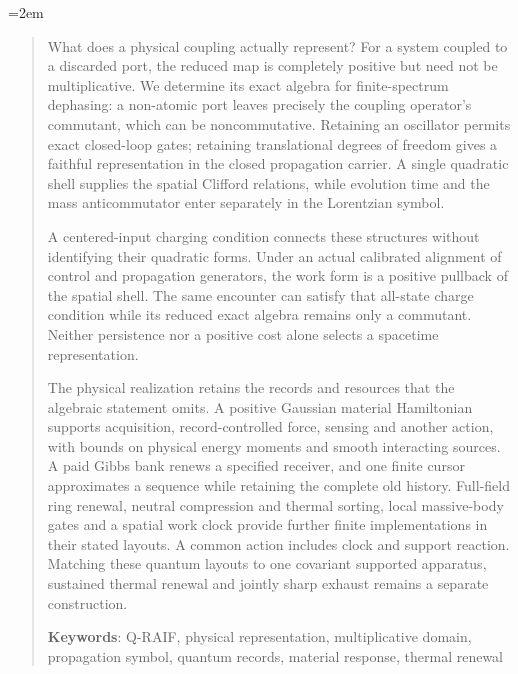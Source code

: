 
\emergencystretch=2em
\raggedbottom
\maketitle

\begin{abstract}
What does a physical coupling actually represent? For a system coupled to a discarded port, the reduced map is completely positive but need not be multiplicative. We determine its exact algebra for finite-spectrum dephasing: a non-atomic port leaves precisely the coupling operator's commutant, which can be noncommutative. Retaining an oscillator permits exact closed-loop gates; retaining translational degrees of freedom gives a faithful representation in the closed propagation carrier. A single quadratic shell supplies the spatial Clifford relations, while evolution time and the mass anticommutator enter separately in the Lorentzian symbol.

A centered-input charging condition connects these structures without identifying their quadratic forms. Under an actual calibrated alignment of control and propagation generators, the work form is a positive pullback of the spatial shell. The same encounter can satisfy that all-state charge condition while its reduced exact algebra remains only a commutant. Neither persistence nor a positive cost alone selects a spacetime representation.

The physical realization retains the records and resources that the algebraic statement omits. A positive Gaussian material Hamiltonian supports acquisition, record-controlled force, sensing and another action, with bounds on physical energy moments and smooth interacting sources. A paid Gibbs bank renews a specified receiver, and one finite cursor approximates a sequence while retaining the complete old history. Full-field ring renewal, neutral compression and thermal sorting, local massive-body gates and a spatial work clock provide further finite implementations in their stated layouts. A common action includes clock and support reaction. Matching these quantum layouts to one covariant supported apparatus, sustained thermal renewal and jointly sharp exhaust remains a separate construction.

\medskip
\noindent\textbf{Keywords}: Q-RAIF, physical representation, multiplicative domain,
propagation symbol, quantum records, material response, thermal renewal
\end{abstract}
